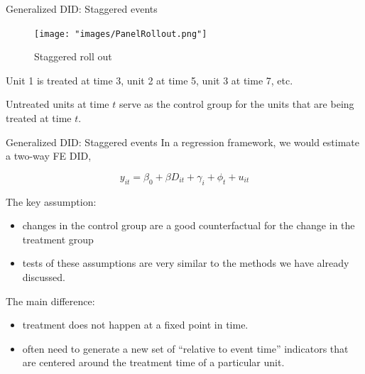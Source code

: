 \documentclass[
  ignorenonframetext,
]{beamer}
\begin{document}
\begin{frame}{Generalized DID: Staggered events}
\protect\hypertarget{generalized-did-staggered-events-1}{}
\begin{figure}
\centering
\texttt{[image: "images/PanelRollout.png"]}
\caption{Staggered roll out}
\end{figure}

Unit 1 is treated at time 3, unit 2 at time 5, unit 3 at time 7, etc.

Untreated units at time \(t\) serve as the control group for the units
that are being treated at time \(t\).
\end{frame}

\begin{frame}{Generalized DID: Staggered events}
\protect\hypertarget{generalized-did-staggered-events-2}{}
In a regression framework, we would estimate a two-way FE DID,

\[
y_{it}=\beta_0+\beta D_{it}+\gamma_i+\phi_t+u_{it}
\]

The key assumption:

\begin{itemize}
\item
  changes in the control group are a good counterfactual for the change
  in the treatment group
\item
  tests of these assumptions are very similar to the methods we have
  already discussed.
\end{itemize}

The main difference:

\begin{itemize}
\item
  treatment does not happen at a fixed point in time.
\item
  often need to generate a new set of ``relative to event time''
  indicators that are centered around the treatment time of a particular
  unit.
\end{itemize}
\end{frame}
\end{document}
